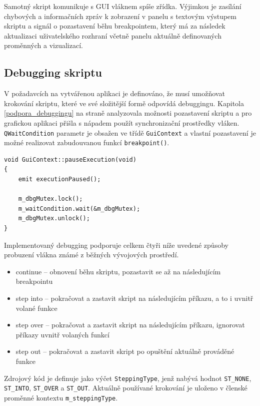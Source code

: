\documentclass[11pt,twoside,a4paper]{book}
\begin{document}
Samotný skript komunikuje s GUI vláknem spíše zřídka. Výjimkou je zasílání chybových a informačních zpráv k zobrazení v panelu s textovým výstupem skriptu a signál o pozastavení běhu breakpointem, který má za následek aktualizaci uživatelského rozhraní včetně panelu aktuálně definovaných proměnných a vizualizací.


\subsection{Debugging skriptu}

V požadavcích na vytvářenou aplikaci je definováno, že musí umožňovat krokování skriptu, které ve své složitější formě odpovídá debuggingu. Kapitola \ref{podpora_debuggingu} na straně \pageref{podpora_debuggingu} analyzovala možnosti pozastavení skriptu a pro grafickou aplikaci přišla s nápadem použít synchronizační prostředky vláken. \texttt{QWaitCondition} parametr je obsažen ve třídě \texttt{GuiContext} a vlastní pozastavení je možné realizovat zabudouvanou funkcí \texttt{breakpoint()}.

\begin{verbatim}
void GuiContext::pauseExecution(void)
{
    emit executionPaused();

    m_dbgMutex.lock();
    m_waitCondition.wait(&m_dbgMutex);
    m_dbgMutex.unlock();
}
\end{verbatim}

Implementovaný debugging podporuje celkem čtyři níže uvedené způsoby probuzení vlákna známé z běžných vývojových prostředí.

\begin{itemize}
\item continue -- obnovení běhu skriptu, pozastavit se až na následujícím breakpointu
\item step into -- pokračovat a zastavit skript na následujícím příkazu, a to i uvnitř volané funkce
\item step over -- pokračovat a zastavit skript na následujícím příkazu, ignorovat příkazy uvnitř volaných funkcí
\item step out -- pokračovat a zastavit skript po opuštění aktuálně prováděné funkce
\end{itemize}

Zdrojový kód je definuje jako výčet \texttt{SteppingType}, jenž nabývá hodnot \texttt{ST\_NONE}, \texttt{ST\_INTO}, \texttt{ST\_OVER} a \texttt{ST\_OUT}. Aktuálně používané krokování je uloženo v členské proměnné kontextu \texttt{m\_step\-ping\-Type}.
\end{document}
